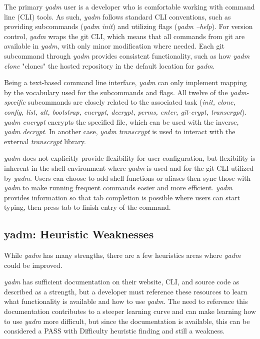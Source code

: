 \documentclass[letterpaper]{jdf}
\begin{document}
 The primary \emph{yadm} user is a developer who is comfortable working with command line (CLI) tools. As such, \emph{yadm} follows standard CLI conventions, such as providing subcommands (\emph{yadm init}) and utilizing flags (\emph{yadm --help}). For version control, \emph{yadm} wraps the git CLI, which means that all commands from git are available in \emph{yadm}, with only minor modification where needed. Each git subcommand through \emph{yadm} provides consistent functionality, such as how \emph{yadm clone} "clones" the hosted repository in the default location for \emph{yadm}.

 Being a text-based command line interface, \emph{yadm} can only implement mapping by the vocabulary used for the subcommands and flags. All twelve of the \emph{yadm-specific} subcommands are closely related to the associated task (\emph{init, clone, config, list, alt, bootstrap, encrypt, decrypt, perms, enter, git-crypt, transcrypt}). \emph{yadm encrypt} encrypts the specified file, which can be used with the inverse, \emph{yadm decrypt}. In another case, \emph{yadm transcrypt} is used to interact with the external \emph{transcrypt} library.

 \emph{yadm} does not explicitly provide flexibility for user configuration, but flexibility is inherent in the shell environment where \emph{yadm} is used and for the git CLI utilized by \emph{yadm}. Users can choose to add shell functions or aliases then sync those with \emph{yadm} to make running frequent commands easier and more efficient. \emph{yadm} provides information so that tab completion is possible where users can start typing, then press tab to finish entry of the command.

\subsection{yadm: Heuristic Weaknesses}
While \emph{yadm} has many strengths, there are a few heuristics areas where \emph{yadm} could be improved.

 \emph{yadm} has sufficient documentation on their website, CLI, and source code as described as a strength, but a developer must reference these resources to learn what functionality is available and how to use \emph{yadm}. The need to reference this documentation contributes to a steeper learning curve and can make learning how to use \emph{yadm} more difficult, but since the documentation is available, this can be considered a PASS with Difficulty heuristic finding and still a weakness.
\end{document}
